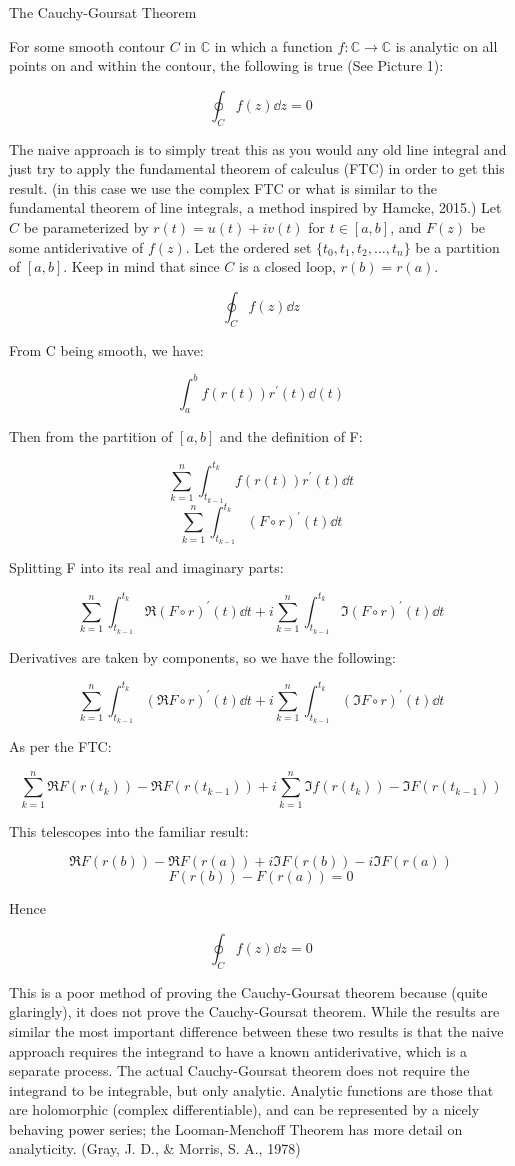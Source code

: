 \documentclass[11pt]{article}
\begin{document}
{\centering{}The Cauchy-Goursat Theorem

}

For some smooth contour $C$ in $\mathbb{C}$ in which a function $f: \mathbb{C}\to\mathbb{C}$ is analytic on all points on and within the contour, the following is true (See Picture 1):

$$\oint_C f(z)\dd{z} = 0$$

The naive approach is to simply treat this as you would any old line integral and just try to apply the fundamental theorem of calculus (FTC) in order to get this result. (in this case we use the complex FTC or what is similar to the fundamental theorem of line integrals, a method inspired by Hamcke, 2015.) Let $C$ be parameterized by $r(t) = u(t) + iv(t)$ for $t\in [a,b]$, and $F(z)$ be some antiderivative of  $f(z)$. Let the ordered set $\{ t_0, t_1, t_2, ... , t_n\}$ be a partition of $[a,b]$. Keep in mind that since $C$ is a closed loop, $r(b) = r(a)$.

$$\oint_C f(z)\dd{z}$$
\centerline{From C being smooth, we have:}
$$\int_a^b f(r(t))r^{\prime}(t)\dd(t)$$
\centerline{Then from the partition of $[a,b]$ and the definition of F:}
$$\sum_{k=1}^n\int_{t_{k-1}}^{t_k} f(r(t))r^{\prime}(t)\dd{t}$$
$$\sum_{k=1}^n\int_{t_{k-1}}^{t_k} (F\circ r)^{\prime}(t)\dd{t}$$
\centerline{Splitting F into its real and imaginary parts:}
$$\sum_{k=1}^n\int_{t_{k-1}}^{t_k} \Re(F\circ r)^{\prime}(t)\dd{t} + i\sum_{k=1}^n\int_{t_{k-1}}^{t_k} \Im(F\circ r)^{\prime}(t)\dd{t}$$
\centerline{Derivatives are taken by components, so we have the following:}
$$\sum_{k=1}^n\int_{t_{k-1}}^{t_k} (\Re F\circ r)^{\prime}(t)\dd{t} + i\sum_{k=1}^n\int_{t_{k-1}}^{t_k} (\Im F\circ r)^{\prime}(t)\dd{t}$$
\centerline{As per the FTC:}
$$\sum_{k=1}^n \Re F(r(t_k)) - \Re F(r(t_{k-1})) + i\sum_{k=1}^n \Im f(r(t_k)) - \Im F(r(t_{k-1}))$$
\centerline{This telescopes into the familiar result:}
$$\Re F(r(b)) - \Re F(r(a)) + i\Im F(r(b)) - i\Im F(r(a))$$
$$F(r(b)) - F(r(a)) = 0$$
\centerline{Hence}
$$\oint_C f(z)\dd{z} = 0$$

This is a poor method of proving the Cauchy-Goursat theorem because (quite glaringly), it does not prove the Cauchy-Goursat theorem. While the results are similar the most important difference between these two results is that the naive approach requires the integrand to have a known antiderivative, which is a separate process. The actual Cauchy-Goursat theorem does not require the integrand to be integrable, but only analytic. Analytic functions are those that are holomorphic (complex differentiable), and can be represented by a nicely behaving power series; the Looman-Menchoff Theorem has more detail on analyticity. (Gray, J. D., \& Morris, S. A., 1978)
\end{document}
